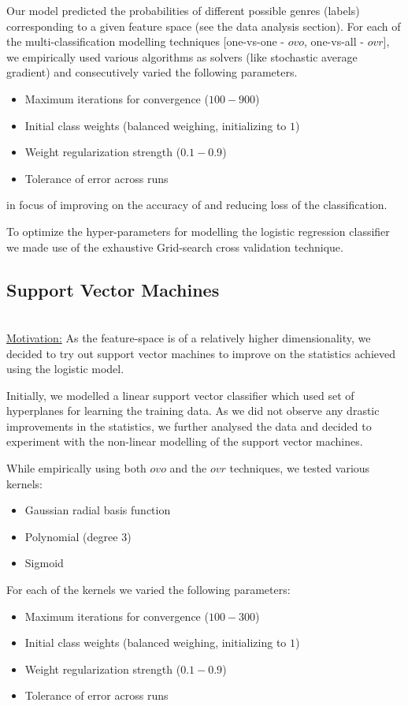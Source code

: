 \documentclass[fleqn,10pt]{SelfArx} %
\begin{document}
Our model predicted the probabilities of different possible genres (labels) corresponding to a given feature space (see the data analysis section). For each of the multi-classification modelling techniques [one-vs-one - $ovo$, one-vs-all - $ovr$], we empirically used various algorithms as solvers (like stochastic average gradient) and consecutively varied the following parameters.
\begin{itemize}
	\item Maximum iterations for convergence ($100-900$)
	\item Initial class weights (balanced weighing, initializing to $1$)
	\item Weight regularization strength ($0.1-0.9$)
	\item Tolerance of error across runs 
\end{itemize}
in focus of improving on the accuracy of and reducing loss of the classification.

To optimize the hyper-parameters for modelling the logistic regression classifier we made use of the exhaustive Grid-search cross validation technique.  
 
\subsection{Support Vector Machines}~\\
\underline{Motivation:} As the feature-space is of a relatively higher dimensionality, we decided to try out support vector machines to improve on the statistics achieved using the logistic model.

Initially, we modelled a linear support vector classifier which used set of hyperplanes for learning the training data. As we did not observe any drastic improvements in the statistics, we further analysed the data and decided to experiment with the non-linear modelling of the support vector machines.

While empirically using both $ovo$ and the $ovr$ techniques, we tested various kernels:
\begin{itemize}
	\item Gaussian radial basis function
	\item Polynomial (degree 3)
	\item Sigmoid
\end{itemize}

For each of the kernels we varied the following parameters:
\begin{itemize}
	\item Maximum iterations for convergence ($100-300$)
	\item Initial class weights (balanced weighing, initializing to $1$)
	\item Weight regularization strength ($0.1-0.9$)
	\item Tolerance of error across runs 
\end{itemize}
\end{document}
